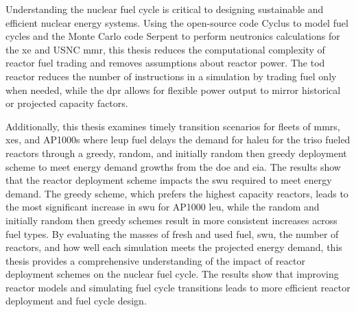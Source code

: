 

Understanding the nuclear fuel cycle is critical to designing sustainable and efficient nuclear energy systems. Using the open-source code Cyclus to model fuel cycles and the Monte Carlo code Serpent to perform neutronics calculations for the \gls{xe} and USNC \gls{mmr}, this thesis reduces the computational complexity of reactor fuel trading and removes assumptions about reactor power. The \gls{tod} reactor reduces the number of instructions in a simulation by trading fuel only when needed, while the \gls{dpr} allows for flexible power output to mirror historical or projected capacity factors.

Additionally, this thesis examines timely transition scenarios for fleets of \glspl{mmr}, \glspl{xe}, and AP1000s where \gls{leup} fuel delays the demand for \gls{haleu} for the \gls{triso} fueled reactors through a greedy, random, and initially random then greedy deployment scheme to meet energy demand growths from the \gls{doe} and \gls{eia}. The results show that the reactor deployment scheme impacts the \gls{swu} required to meet energy demand. The greedy scheme, which prefers the highest capacity reactors, leads to the most significant increase in \gls{swu} for AP1000 \gls{leu}, while the random and initially random then greedy schemes result in more consistent increases across fuel types. By evaluating the masses of fresh and used fuel, \gls{swu}, the number of reactors, and how well each simulation meets the projected energy demand, this thesis provides a comprehensive understanding of the impact of reactor deployment schemes on the nuclear fuel cycle. The results show that improving reactor models and simulating fuel cycle transitions leads to more efficient reactor deployment and fuel cycle design.



